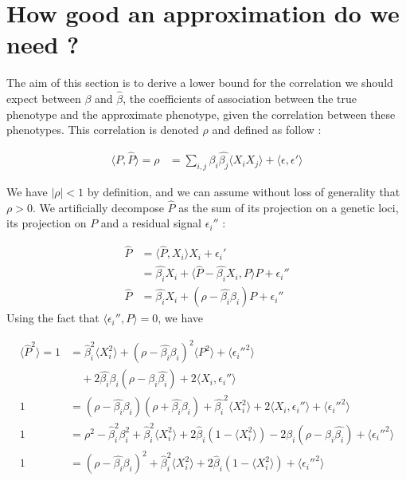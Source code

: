 \documentclass{article}
\begin{document}
\section{How good an approximation do we need ?}

The aim of this section is to derive a lower bound for the correlation we should expect between $\beta$ and $\hat{\beta}$, the coefficients of association between the true phenotype and the approximate phenotype, given the correlation between these phenotypes. This correlation is denoted $\rho$ and defined as follow :

\begin{equation}
\begin{split}
\langle P, \hat{P} \rangle = \rho &= \sum_{i,j} \beta_i \hat{\beta_j} \langle X_i X_j \rangle + \langle \epsilon, \epsilon' \rangle
\end{split}
\end{equation}

We have $|\rho| < 1$ by definition, and we can assume without loss of generality that $\rho > 0$. We artificially decompose $\hat{P}$ as the sum of its projection on a genetic loci, its projection on $P$ and a residual signal $\epsilon_i''$ :

\begin{equation}
\begin{split}
\hat{P} &= \langle \hat{P}, X_i \rangle X_i + \epsilon_i' \\
&= \hat{\beta_i}X_i + \langle\hat{P} -\hat{\beta_i}X_i,P \rangle P + \epsilon_i'' \\
\hat{P} &= \hat{\beta_i}X_i + (\rho - \hat{\beta_i}\beta_i) P + \epsilon_i''
\end{split}
\end{equation}
Using the fact that $\langle \epsilon_i'', P \rangle = 0$, we have

\begin{equation*}
\begin{aligned}
\langle \hat{P}^2 \rangle = 1 & = \hat{\beta}_i^2 \langle X_i^2 \rangle + (\rho - \hat{\beta_i}\beta_i)^2 \langle P^2 \rangle + \langle \epsilon_i''^2 \rangle \\
&\quad + 2\hat{\beta_i}\beta_i(\rho - \beta_i \hat{\beta_i})  + 2 \langle X_i, \epsilon_i'' \rangle \\
1 & = (\rho - \hat{\beta_i}\beta_i)(\rho + \hat{\beta_i}\beta_i) + \hat{\beta_i}^2 \langle X_i^2 \rangle +2 \langle X_i, \epsilon_i'' \rangle + \langle \epsilon_i''^2 \rangle \\
1 &= \rho^2 - \hat{\beta}_i^2\beta_i^2 + \hat{\beta}_i^2 \langle X_i^2 \rangle + 2\hat{\beta}_i(1- \langle X_i^2 \rangle) - 2\beta_i(\rho - \beta_i \hat{\beta_i}) + \langle \epsilon_i''^2 \rangle \\
1 &= (\rho - \hat{\beta_i}\beta_i)^2 + \hat{\beta}_i^2 \langle X_i^2 \rangle + 2\hat{\beta}_i(1- \langle X_i^2 \rangle) + \langle \epsilon_i''^2 \rangle
\end{aligned}
\end{equation*}
\end{document}
